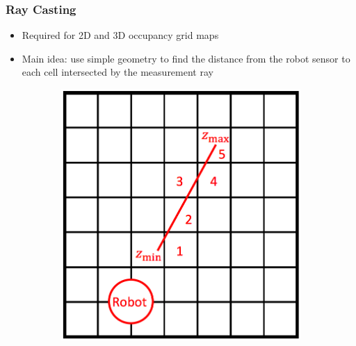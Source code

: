 \documentclass[11pt,professionalfonts,hyperref={pdftex,pdfpagemode=none,pdfstartview=FitH}]{beamer}
\begin{document}
\begin{frame}
\frametitle{Ray Casting}

\begin{itemize}
	\item Required for 2D and 3D occupancy grid maps
	\item Main idea: use simple geometry to find the distance from the robot sensor to each cell intersected by the measurement ray
\end{itemize}

\begin{figure}[!ht]
    \centering
    \begin{subfigure}[t]{0.4\columnwidth}
        \centering
        \includegraphics[width=\textwidth]{RayCastingIllustration.png}
    \end{subfigure}
    \hspace*{0.05\columnwidth}
    \begin{subfigure}[t]{0.4\columnwidth}
        \centering

\end{subfigure}
\end{figure}
\end{frame}
\end{document}
